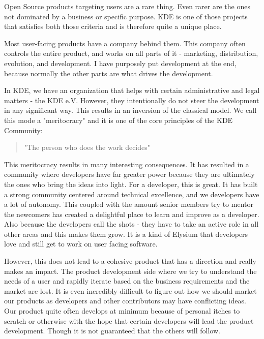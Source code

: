 

\noindent{}Open Source products targeting users are a rare thing. Even rarer are the ones not dominated by a business or specific purpose. KDE is one of those projects that satisfies both those criteria and is therefore quite a unique place.

Most user-facing products have a company behind them. This company often controls the entire product, and works on all parts of it - marketing, distribution, evolution, and development. I have purposely put development at the end, because normally the other parts are what drives the development.

In KDE, we have an organization that helps with certain administrative and legal matters - the KDE e.V. However, they intentionally do not steer the development in any significant way. This results in an inversion of the classical model. We call this mode a "meritocracy" and it is one of the core principles of the KDE Community:

\begin{quote}"The person who does the work decides"\end{quote}

This meritocracy results in many interesting consequences. It has resulted in a community where developers have far greater power because they are ultimately the ones who bring the ideas into light. For a developer, this is great. It has built a strong community centered around technical excellence, and we developers have a lot of autonomy. This coupled with the amount senior members try to mentor the newcomers has created a delightful place to learn and improve as a developer. Also because the developers call the shots - they have to take an active role in all other areas and this makes them grow. It is a kind of Elysium that developers love and still get to work on user facing software.

However, this does not lead to a cohesive product that has a direction and really makes an impact. The product development side where we try to understand the needs of a user and rapidly iterate based on the business requirements and the market are lost. It is even incredibly difficult to figure out how we should market our products as developers and other contributors may have conflicting ideas. Our product quite often develops at minimum because of personal itches to scratch or otherwise with the hope that certain developers will lead the product development. Though it is not guaranteed that the others will follow.

